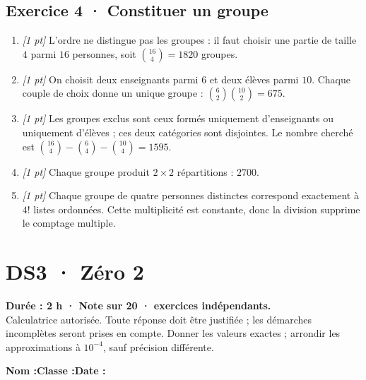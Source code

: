 \subsection*{Exercice 4 · Constituer un groupe}\begin{enumerate}

\item \textit{[1 pt]} L'ordre ne distingue pas les groupes : il faut choisir une partie de taille $4$ parmi $16$ personnes, soit $\binom{16}4=1820$ groupes.

\item \textit{[1 pt]} On choisit deux enseignants parmi $6$ et deux élèves parmi $10$. Chaque couple de choix donne un unique groupe : $\binom{6}2\binom{10}2=675$.

\item \textit{[1 pt]} Les groupes exclus sont ceux formés uniquement d'enseignants ou uniquement d'élèves ; ces deux catégories sont disjointes. Le nombre cherché est $\binom{16}4-\binom{6}4-\binom{10}4=1595$.

\item \textit{[1 pt]} Chaque groupe produit $2\times2$ répartitions : $2700$.

\item \textit{[1 pt]} Chaque groupe de quatre personnes distinctes correspond exactement à $4!$ listes ordonnées. Cette multiplicité est constante, donc la division supprime le comptage multiple.

\end{enumerate}

\fi

\mxnewpage{}\label{sujet:4-2}

\section*{DS3 · Zéro 2}


\textbf{Durée : 2 h · Note sur 20 ·  exercices indépendants.}\\Calculatrice autorisée. Toute réponse doit être justifiée ; les démarches incomplètes seront prises en compte. Donner les valeurs exactes ; arrondir les approximations à $10^{-4}$, sauf précision différente.

\smallskip\textbf{Nom :}\enspace\dotfill\quad\textbf{Classe :}\enspace\dotfill\quad\textbf{Date :}\enspace\dotfill

